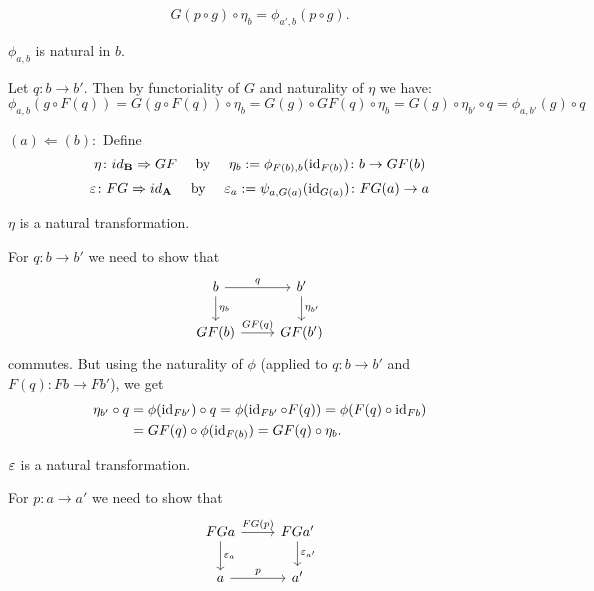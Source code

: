 \begin{bigproof}
\begin{smallproof}
\[      G(p \circ g) \circ \eta_b = \phi_{a',b}(p \circ g).
    \]
\end{smallproof}
\begin{claim*}
    $\phi_{a,b}$ is natural in $b$.
\end{claim*}
\begin{smallproof}
    Let $q \colon b \to b'$. Then by functoriality of $G$ and naturality of $\eta$ we have: 
    \[
       \phi_{a,b}(g \circ F(q)) = G(g \circ F(q)) \circ \eta_b = G(g) \circ GF(q) \circ \eta_b
       = G(g) \circ \eta_{b'} \circ q = \phi_{a,b'}(g) \circ q
     \]
\end{smallproof}
$(a)\Leftarrow (b):$ Define 
\[
    \eta \colon id_{\mathbf{B}} \Rightarrow GF \quad \text{ by } \quad \eta_b := \phi_{F(b),b}(\operatorname{id}_{F(b)})
    \colon b \to GF(b) \\
\]
\[
    \varepsilon \colon FG \Rightarrow id_{\mathbf{A}} \quad \text{ by } \quad \varepsilon_a := \psi_{a,G(a)}(\operatorname{id}_{G(a)})
    \colon FG(a) \to a
\]
\begin{claim*}
    $\eta$ is a natural transformation.
\end{claim*}
\begin{smallproof}
    For $q \colon b \to b'$ we need to show that 
    \[
        \begin{tikzcd}
            b \arrow[r,"q"] \arrow[d,"\eta_b"] 
              & b' \arrow[d,"\eta_{b'}"] \\
            GF(b) \arrow[r,"GF(q)"]
              & GF(b')
        \end{tikzcd}
    \]
    commutes. But using the naturality of $\phi$ (applied to $q \colon b \to b'$ and
    $F(q) \colon Fb \to Fb'$), we get
    \begin{align*}
        \eta_{b'} \circ q &= \phi(\operatorname{id}_{Fb'}) \circ q = \phi(\operatorname{id}_{Fb'} \circ F(q))  = \phi(F(q) \circ \operatorname{id}_{Fb}) \\
        &= GF(q) \circ \phi(\operatorname{id}_{F(b)}) = GF(q) \circ \eta_b.
    \end{align*}
\end{smallproof}
\begin{claim*}
    $\varepsilon$ is a natural transformation.
\end{claim*}
\begin{smallproof}
    For $p \colon a \to a'$ we need to show that
    \[
      \begin{tikzcd}
          FGa \arrow[r,"FG(p)"] \arrow[d,"\eps_a"] 
            & FGa' \arrow[d,"\eps_{a'}"] \\
          a \arrow[r,"p"]
            & a'
      \end{tikzcd}  
\]
\end{smallproof}
\end{bigproof}
